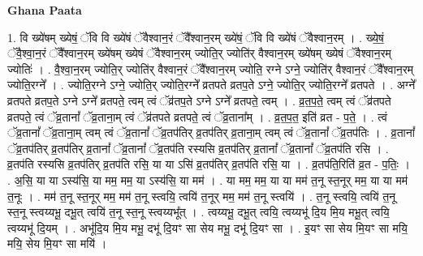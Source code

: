 \documentclass[17pt]{extarticle}
\begin{document}
\textbf{Ghana Paata } \newline

1. वि ख्ये॑षम् ख्येषं॒ ॅवि वि ख्ये॑षं ॅवैश्वान॒रं ॅवै᳚श्वान॒रम् ख्ये॑षं॒ ॅवि वि ख्ये॑षं ॅवैश्वान॒रम् । . ख्ये॒षं॒ ॅवै॒श्वा॒न॒रं ॅवै᳚श्वान॒रम् ख्ये॑षम् ख्येषं ॅवैश्वान॒रम् ज्योति॒र् ज्योति॑र् वैश्वान॒रम् ख्ये॑षम् ख्येषं ॅवैश्वान॒रम् ज्योतिः॑ । . वै॒श्वा॒न॒रम् ज्योति॒र् ज्योति॑र् वैश्वान॒रं ॅवै᳚श्वान॒रम् ज्योति॒ रग्ने ऽग्ने॒ ज्योति॑र् वैश्वान॒रं ॅवै᳚श्वान॒रम् ज्योति॒रग्ने᳚ । . ज्योति॒रग्ने ऽग्ने॒ ज्योति॒र् ज्योति॒रग्ने᳚ व्रतपते व्रतप॒ते ऽग्ने॒ ज्योति॒र् ज्योति॒रग्ने᳚ व्रतपते । . अग्ने᳚ व्रतपते व्रतप॒ते ऽग्ने ऽग्ने᳚ व्रतपते॒ त्वम् त्वं ॅव्र॑तप॒ते ऽग्ने ऽग्ने᳚ व्रतपते॒ त्वम् । . व्र॒त॒प॒ते॒ त्वम् त्वं ॅव्र॑तपते व्रतपते॒ त्वं ॅव्र॒तानां᳚ ॅव्र॒ताना॒म् त्वं ॅव्र॑तपते व्रतपते॒ त्वं ॅव्र॒ताना᳚म् । . व्र॒त॒प॒त॒ इति॑ व्रत - प॒ते॒ । . त्वं ॅव्र॒तानां᳚ ॅव्र॒ताना॒म् त्वम् त्वं ॅव्र॒तानां᳚ ॅव्र॒तप॑तिर् व्र॒तप॑तिर् व्र॒ताना॒म् त्वम् त्वं ॅव्र॒तानां᳚ ॅव्र॒तप॑तिः । . व्र॒तानां᳚ ॅव्र॒तप॑तिर् व्र॒तप॑तिर् व्र॒तानां᳚ ॅव्र॒तानां᳚ ॅव्र॒तप॑ति रस्यसि व्र॒तप॑तिर् व्र॒तानां᳚ ॅव्र॒तानां᳚ ॅव्र॒तप॑ति रसि । . व्र॒तप॑ति रस्यसि व्र॒तप॑तिर् व्र॒तप॑ति रसि॒ या या ऽसि॑ व्र॒तप॑तिर् व्र॒तप॑ति रसि॒ या । . व्र॒तप॑ति॒रिति॑ व्र॒त - प॒तिः॒ । . अ॒सि॒ या या ऽस्य॑सि॒ या मम॒ मम॒ या ऽस्य॑सि॒ या मम॑ । . या मम॒ मम॒ या या मम॑ त॒नू स्त॒नूर् मम॒ या या मम॑ त॒नूः । . मम॑ त॒नू स्त॒नूर् मम॒ मम॑ त॒नू स्त्वयि॒ त्वयि॑ त॒नूर् मम॒ मम॑ त॒नू स्त्वयि॑ । . त॒नू स्त्वयि॒ त्वयि॑ त॒नू स्त॒नू स्त्वय्यभू॒ दभू॒त् त्वयि॑ त॒नू स्त॒नू स्त्वय्यभू᳚त् । . त्वय्यभू॒ दभू॒त् त्वयि॒ त्वय्यभू॑ दि॒य मि॒य मभू॒त् त्वयि॒ त्वय्यभू॑ दि॒यम् । . अभू॑दि॒य मि॒य मभू॒ दभू॑ दि॒यꣳ सा सेय मभू॒ दभू॑ दि॒यꣳ सा । . इ॒यꣳ सा सेय मि॒यꣳ सा मयि॒ मयि॒ सेय मि॒यꣳ सा मयि॑ । \newline
\end{document}
